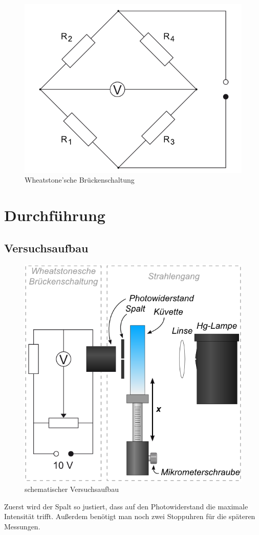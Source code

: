 \documentclass[12pt,a4paper,titlepage,headinclude,bibtotoc]{scrartcl}
\begin{document}
\begin{figure}[!htb]
	\centering	
	\includegraphics[scale=0.7]{Brueckenschaltung.png}
	\caption{Wheatstone'sche Brückenschaltung \cite{lp}}
	\label{fig:bruecke}
\end{figure}


\section{Durchführung}
\label{sec:durchfuehrung}
\subsection{Versuchsaufbau}
\begin{figure}[!htb]
	\centering	
	\includegraphics[scale=0.7]{Aufbau_schematisch.png}
	\caption{schematischer Versuchsaufbau \cite{lp}}
\end{figure}
Zuerst wird der Spalt so justiert, dass auf den Photowiderstand die maximale Intensität trifft.
Außerdem benötigt man noch zwei Stoppuhren für die späteren Messungen.
\end{document}
